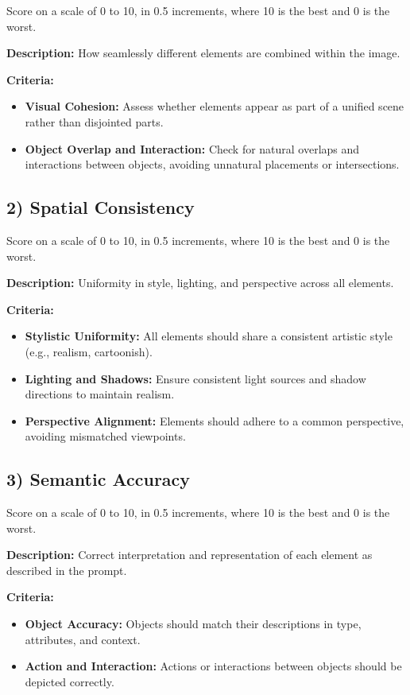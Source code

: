 Score on a scale of 0 to 10, in 0.5 increments, where 10 is the best and 0 is the worst.

\textbf{Description:} How seamlessly different elements are combined within the image.

\textbf{Criteria:}
\begin{itemize}
    \item \textbf{Visual Cohesion:} Assess whether elements appear as part of a unified scene rather than disjointed parts.
    \item \textbf{Object Overlap and Interaction:} Check for natural overlaps and interactions between objects, avoiding unnatural placements or intersections.
\end{itemize}

\subsection*{2) Spatial Consistency}

Score on a scale of 0 to 10, in 0.5 increments, where 10 is the best and 0 is the worst.

\textbf{Description:} Uniformity in style, lighting, and perspective across all elements.

\textbf{Criteria:}
\begin{itemize}
    \item \textbf{Stylistic Uniformity:} All elements should share a consistent artistic style (e.g., realism, cartoonish).
    \item \textbf{Lighting and Shadows:} Ensure consistent light sources and shadow directions to maintain realism.
    \item \textbf{Perspective Alignment:} Elements should adhere to a common perspective, avoiding mismatched viewpoints.
\end{itemize}

\subsection*{3) Semantic Accuracy}

Score on a scale of 0 to 10, in 0.5 increments, where 10 is the best and 0 is the worst.

\textbf{Description:} Correct interpretation and representation of each element as described in the prompt.

\textbf{Criteria:}
\begin{itemize}
    \item \textbf{Object Accuracy:} Objects should match their descriptions in type, attributes, and context.
    \item \textbf{Action and Interaction:} Actions or interactions between objects should be depicted correctly.
\end{itemize}

